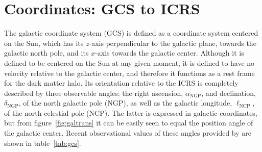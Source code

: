 \section{Coordinates: GCS to ICRS}

The galactic coordinate system (GCS) is defined as a coordinate system centered on the Sun, which has its $z$-axis perpendicular to the galactic plane, towards the galactic north pole, and its $x$-axis towards the galactic center. Although it is defined to be centered on the Sun at any given moment, it is defined to have no velocity relative to the galactic center, and therefore it functions as a rest frame for the dark matter halo. Its orientation relative to the ICRS is completely described by three observable angles: the right ascension, $\alpha_\text{NGP}$, and declination, $\delta_\text{NGP}$, of the north galactic pole (NGP), as well as the galactic longitude, $\ell_\text{NCP}$, of the north celestial pole (NCP). The latter is expressed in galactic coordinates, but from figure~\ref{fig:galtrans} it can be easily seen to equal the position angle of the galactic center. Recent observational values of these angles provided by \cite{KarimMamajek2017} are shown in table~\ref{tab:gcs}.


